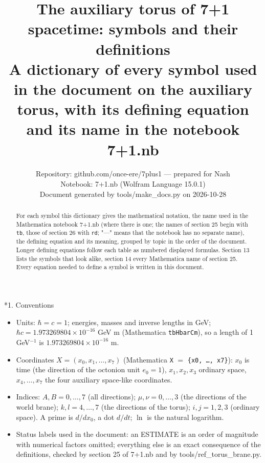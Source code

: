 \documentclass[10pt,a4paper]{article}
\makeatletter
\renewcommand\section{\@startsection{section}{1}{\z@}{-3.5ex \@plus -1ex \@minus -.2ex}{2.3ex \@plus.2ex}{\normalfont\Large\bfseries\raggedright}}
\makeatother
\begin{document}
\title{The auxiliary torus of 7+1 spacetime: symbols and their definitions\\[0.4em]\large A dictionary of every symbol used in the document on the auxiliary torus, with its defining equation and its name in the notebook 7+1.nb}
\author{Repository: github.com/once-ere/7plus1 — prepared for Nash\\ Notebook: 7+1.nb (Wolfram Language 15.0.1)\\ Document generated by tools/make\_docs.py on 2026-10-28}
\date{}
\maketitle
\begin{abstract}
For each symbol this dictionary gives the mathematical notation, the name used in the Mathematica notebook 7+1.nb (where there is one; the names of section 25 begin with \texttt{tb}, those of section 26 with \texttt{rd}; "—" means that the notebook has no separate name), the defining equation and its meaning, grouped by topic in the order of the document. Longer defining equations follow each table as numbered displayed formulas. Section 13 lists the symbols that look alike, section 14 every Mathematica name of section 25. Every equation needed to define a symbol is written in this document.
\end{abstract}
\tableofcontents
{}\section*{1. Conventions}
\begin{itemize}
\item Units: $\hbar=c=1$; energies, masses and inverse lengths in GeV; $\hbar c=1.973269804\times10^{-16}$ GeV m (Mathematica \texttt{tbHbarCm}), so a length of 1 GeV$^{-1}$ is $1.973269804\times10^{-16}$ m.
\item Coordinates $X=(x_0,x_1,\dots,x_7)$ (Mathematica \texttt{X} $=$ \texttt{\{x0, …, x7\}}): $x_0$ is time (the direction of the octonion unit $e_0=1$), $x_1,x_2,x_3$ ordinary space, $x_4,\dots,x_7$ the four auxiliary space-like coordinates.
\item Indices: $A,B=0,\dots,7$ (all directions); $\mu,\nu=0,\dots,3$ (the directions of the world brane); $k,l=4,\dots,7$ (the directions of the torus); $i,j=1,2,3$ (ordinary space). A prime is $d/dx_0$, a dot $d/dt$; $\ln$ is the natural logarithm.
\item Status labels used in the document: an ESTIMATE is an order of magnitude with numerical factors omitted; everything else is an exact consequence of the definitions, checked by section 25 of 7+1.nb and by tools/ref\_torus\_brane.py.
\end{itemize}
\end{document}
